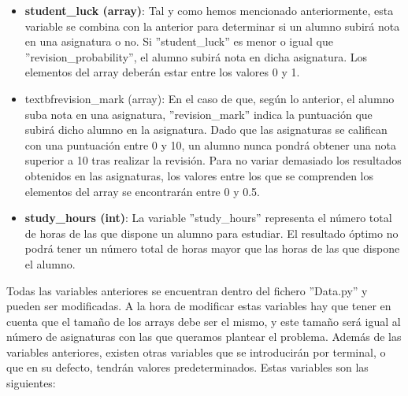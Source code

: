 \documentclass[11pt, a4paper, titlepage]{article}
\begin{document}
\begin{itemize}
\vspace{5mm}

\item \textbf{student\_luck (array)}: Tal y como hemos mencionado anteriormente, esta variable se combina con la anterior para determinar si un alumno subirá nota en una asignatura o no. Si ''student\_luck'' es menor o igual que ''revision\_probability'', el alumno subirá nota en dicha asignatura. Los elementos del array deberán estar entre los valores 0 y 1.

\vspace{5mm}

\item textbf{revision\_mark (array)}: En el caso de que, según lo anterior, el alumno suba nota en una asignatura, ''revision\_mark'' indica la puntuación que subirá dicho alumno en la asignatura. Dado que las asignaturas se califican con una puntuación entre 0 y 10, un alumno nunca pondrá obtener una nota superior a 10 tras realizar la revisión. Para no variar demasiado los resultados obtenidos en las asignaturas, los valores entre los que se comprenden los elementos del array se encontrarán entre 0 y 0.5.

\vspace{5mm}

\item \textbf{study\_hours (int)}: La variable ''study\_hours'' representa el número total de horas de las que dispone un alumno para estudiar. El resultado óptimo no podrá tener un número total de horas mayor que las horas de las que dispone el alumno.

\end{itemize}

\vspace{5mm}

Todas las variables anteriores se encuentran dentro del fichero ''Data.py'' y pueden ser modificadas. A la hora de modificar estas variables hay que tener en cuenta que el tamaño de los arrays debe ser el mismo, y este tamaño será igual al número de asignaturas con las que queramos plantear el problema. Además de las variables anteriores, existen otras variables que se introducirán por terminal, o que en su defecto, tendrán valores predeterminados. Estas variables son las siguientes: 

\vspace{5mm}
\end{document}
